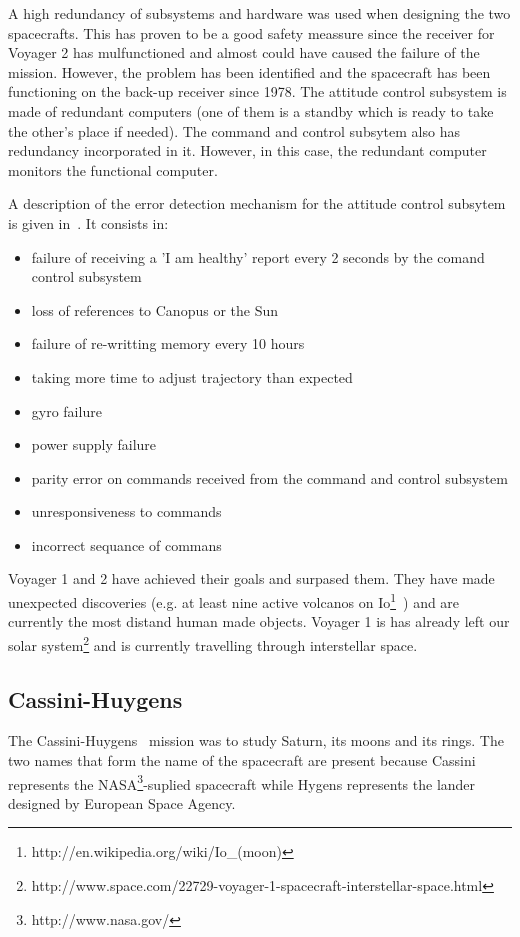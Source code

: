 A high redundancy of subsystems and hardware was used when designing the two
spacecrafts. This has proven to be a good safety meassure since the receiver for
Voyager 2 has mulfunctioned and almost could have caused the failure of the
mission. However, the problem has been identified and the spacecraft has been
functioning on the back-up receiver since 1978. The attitude control subsystem
is made of redundant computers (one of them is a standby which is ready to take
the other's place if needed). The command and control subsytem also has
redundancy incorporated in it. However, in this case, the redundant computer
monitors the functional computer.

A description of the error detection mechanism for the attitude control subsytem
is given in~\cite{ft-space-avionics}. It consists in:
\begin{itemize}
  \item failure of receiving a 'I am healthy' report every 2 seconds by the
  comand control subsystem
  \item loss of references to Canopus or the Sun
  \item failure of re-writting memory every 10 hours
  \item taking more time to adjust trajectory than expected
  \item gyro failure
  \item power supply failure
  \item parity error on commands received from the command and control subsystem
  \item unresponsiveness to commands
  \item incorrect sequance of commans
\end{itemize}

Voyager 1 and 2 have achieved their goals and surpased them. They have made
unexpected discoveries (e.g. at least nine active volcanos on
Io\footnote{http://en.wikipedia.org/wiki/Io\_(moon)}~\cite{tvs}) and are
currently the most distand human made objects. Voyager 1 is has already left our
solar
system\footnote{http://www.space.com/22729-voyager-1-spacecraft-interstellar-space.html}
and is currently travelling through interstellar space.

\subsection{Cassini-Huygens}

The Cassini-Huygens~\cite{ch-nasa} mission was to study Saturn, its moons and
its rings. The two names that form the name of the spacecraft are present because
Cassini represents the NASA\footnote{http://www.nasa.gov/}-suplied spacecraft
while Hygens represents the lander designed by European Space Agency.

